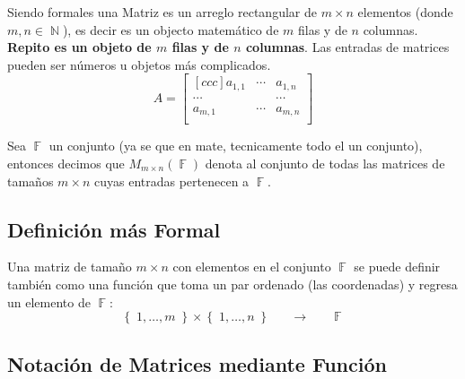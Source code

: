\documentclass[12pt, fleqn]{report}                             %
\DeclareMathOperator \Space {\quad}                             %
\theoremstyle{break}                                            %
\newcommand \lLongTo {\longrightarrow}                          %
\DeclareMathOperator \Naturals     {\mathbb{N}}                 %
\DeclareMathOperator \GenericField {\mathbb{F}}                 %
\newcommand{\Set}[1]    {\left\{ \; #1 \; \right\}}             %
\begin{document}
            Siendo formales una Matriz es un arreglo rectangular de $m \times n$ elementos 
            (donde $m,n \in \Naturals$), es decir es un objecto matemático de $m$ filas y
            de $n$ columnas. \textbf{Repito es un objeto de $m$ filas y de $n$ columnas}.
            Las entradas de matrices pueden ser números u objetos más complicados.
            \begin{equation*}
                A = 
                \begin{bmatrix}[ccc]
                    a _{1, 1}   & \cdots & a_{1,n}   \\
                    \cdots      &        & \cdots    \\
                    a _{m, 1}   & \cdots & a_{m,n}   \\
                \end{bmatrix}
            \end{equation*}
            
            Sea $\GenericField$ un conjunto (ya se que en mate, tecnicamente todo el un conjunto),
            entonces decimos que $M_{m \times n}(\GenericField)$ denota al conjunto de todas las
            matrices de tamaños $m \times n$ cuyas entradas pertenecen a $\GenericField$.


            \vspace{2em}
            \subsection*{Definición más Formal}
                Una matriz de tamaño $m \times n$ con elementos en el conjunto $\GenericField$ se puede
                definir también como una función que toma un par ordenado (las coordenadas) y regresa
                un elemento de $\GenericField$: 
                \begin{equation*}
                    \Set{1, \dots, m} \times \Set{1, \dots , n}
                        \Space \lLongTo \Space
                    \GenericField
                \end{equation*}


            \clearpage
            \subsection{Notación de Matrices mediante Función}
\end{document}

